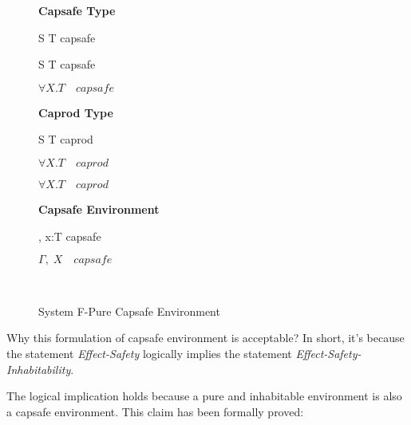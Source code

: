 \begin{figure}[h]
\begin{framed}

\setlength{\columnseprule}{0.4pt}
\begin{multicols}{2}

\textbf{Capsafe Type}


{ S \to T \quad capsafe }

{ S \to T \quad capsafe }

{ \colorbox{shade}{$\forall X.T \quad capsafe$} }

\columnbreak

\textbf{Caprod Type}


{ S \to T \quad caprod }

{ \colorbox{shade}{$\forall X.T \quad caprod$} }

{ \colorbox{shade}{$\forall X.T \quad caprod$} }

\textbf{Capsafe Environment}


{ \Gamma, \; x:T \quad capsafe }

{ \colorbox{shade}{$\Gamma, \; X \quad capsafe$} }

\hfill\\

\end{multicols}
\end{framed}

\caption{System F-Pure Capsafe Environment}
\label{fig:f-pure-capsafe-definition}
\end{figure}

Why this formulation of capsafe environment is acceptable? In short,
it's because the statement \emph{Effect-Safety} logically implies the
statement \emph{Effect-Safety-Inhabitability}.

The logical implication holds because a pure and inhabitable
environment is also a capsafe environment. This claim has been
formally proved:

